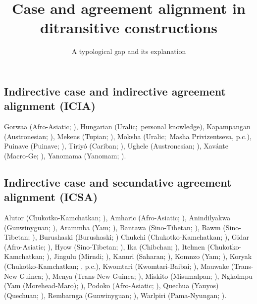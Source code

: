 \documentclass{scrartcl}
\title{Case and agreement alignment in ditransitive constructions}
\subtitle{A typological gap and its explanation}
\author{}
\date{}
\begin{document}
\maketitle

\newrefcontext[sorting=nyt]
\printbibliography

\appendix

\subsection{Indirective case and indirective agreement alignment (ICIA)}\label{sapp:icia}

{\footnotesize
Gorwaa (Afro-Asiatic; \cite[176]{Harvey2018}), Hungarian (Uralic;~personal
knowledge), Kapampangan (Austronesian; \cites[91, 116, 170,
195--196]{Mirikitani1972}[249--250]{Mithun1994}), Mekens
(Tupian; \cite[82]{Galucio2001}), Moksha (Uralic;~Masha Privizentseva, p.c.),
Puinave (Puinave; \cites[320, 351]{Girón2008}[62--63]{Birchall2014}), Tiriyó
(Cariban; \cite[512--515]{Meira1999}), Ughele (Austronesian; \cite[110, 129, 159,
210, 234]{Frostad2012}), Xavánte (Macro-Ge; \cite[177]{Estevam2011}), Yanomama
(Yanomam; \cite[395, 407, 408--409, 423, 435, 506]{Ferreira2017}).
}

\subsection{Indirective case and secundative agreement alignment (ICSA)}\label{sapp:icsa}

{\footnotesize
Alutor (Chukotko-Kamchatkan; \cite{Melcuk1988,BobWur2002}), Amharic
(Afro-Asiatic; \cite{Baker2012c}), Anindilyakwa (Gunwinyguan; \cite[305--307,
315, 334, 361, 398, 400, 413--414, 414, 501]{Leeding1989}), Arammba
(Yam; \cite[228--230]{Reesink2013}), Bantawa (Sino-Tibetan; \cite[143, 180, 201,
215]{Doornenbal2009}), Bawm (Sino-Tibetan; \cite[24--25, 93, 103, 122, 149,
157--158, 161]{Reichle1981}), Burushaski (Burushaski; \cite{Baker2015b}) Chukchi
(Chukotko-Kamchatkan; \cite{Melcuk1988,Dunn1999,BobWur2002}), Gidar
(Afro-Asiatic; \cite[174--185]{Frajzyngier2008}), Hyow
(Sino-Tibetan; \cite[179]{Peterson2003}), Ika (Chibchan; \cites[28,
67]{Frank1985}{Landaburu1992}), Itelmen
(Chukotko-Kamchatkan; \cite{BobWur2002}), Jingulu (Mirndi; \cite[105--109,
212--214, 216--220]{Pensalfini2003}), Kanuri
(Saharan; \cites[117]{Hutchison1981}{NahawuKanuri1986}[305--308]{Cyffer1978}),
Komnzo (Yam; \cite[204--207, 227, 229, 294, 317]{Dohler2018}), Koryak
(Chukotko-Kamchatkan; \cites{Abramovitz2020,Abramovitz2021}, p.c.), Kwomtari
(Kwomtari-Baibai; \cite[109--110]{Spencer2008}), Mauwake (Trans-New
Guinea; \cite[162--164, 260--262]{Berghaell2015}), Menya (Trans-New
Guinea; \cite[22--25, 84]{Whitehead2006}), Miskito
(Misumalpan; \cite[106]{Salamanca2008}), Ngkolmpu (Yam
(Morehead-Maro); \cite[148--149]{Carroll2016}), Podoko (Afro-Asiatic; \cite[90,
103]{Jarvis1989}), Quechua (Yauyos) (Quechuan; \cite[48, 138, 141, 143, 145,
147, 153]{Shimelman2017}), Rembarnga (Gunwinyguan; \cite[126--127, 143, 258--261,
263, 297--298]{McKay1975}), Warlpiri (Pama-Nyungan; \cite[170--175]{Legate2002}).
}
\end{document}
